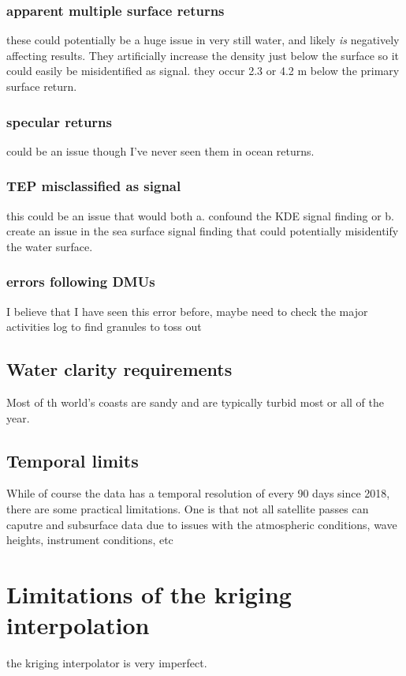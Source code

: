 \subsubsection{apparent multiple surface returns}
these could potentially be a huge issue in very still water, and likely \emph{is} negatively affecting results. They artificially increase the density just below the surface so it could easily be misidentified as signal. they occur 2.3 or 4.2 m below the primary surface return.

\subsubsection{specular returns}
could be an issue though I've never seen them in ocean returns. 

\subsubsection{TEP misclassified as signal}
this could be an issue that would both a. confound the KDE signal finding or b. create an issue in the sea surface signal finding that could potentially misidentify the water surface.

\subsubsection{errors following DMUs}
I believe that I have seen this error before, maybe need to check the major activities log to find granules to toss out



\subsection{Water clarity requirements}
Most of th world's coasts are sandy and are typically turbid most or all of the year.
\subsection{Temporal limits}
While of course the data has a temporal resolution of every 90 days since 2018, there are some practical limitations. One is that not all satellite passes can caputre and subsurface data due to issues with the atmospheric conditions, wave heights, instrument conditions, etc 

\section{Limitations of the kriging interpolation}
the kriging interpolator is very imperfect.
